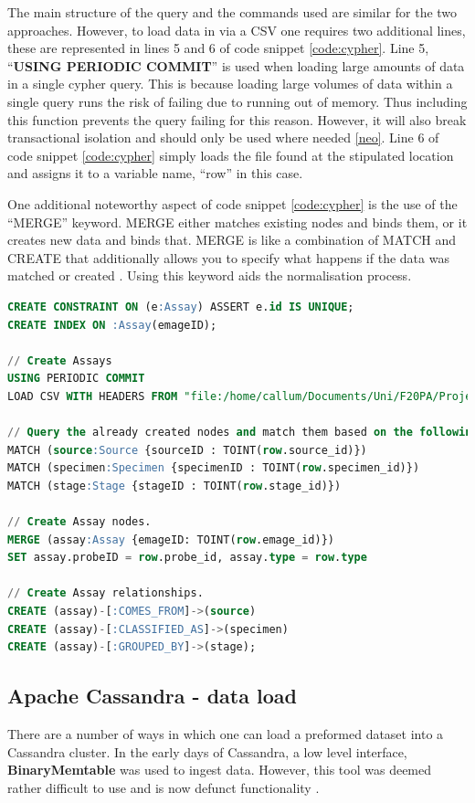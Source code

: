 The main structure of the query and the commands used are similar for the two approaches. However, to load data in via a CSV one requires two additional lines, these are represented in lines 5 and 6 of code snippet \ref{code:cypher}. Line 5, ``\textbf{USING PERIODIC COMMIT}'' is used when loading large amounts of data in a single cypher query. This is because loading large volumes of data within a single query runs the risk of failing due to running out of memory. Thus including this function prevents the query failing for this reason. However, it will also break transactional isolation and should only be used where needed \ref{neo}. Line 6 of code snippet \ref{code:cypher} simply loads the file found at the stipulated location and assigns it to a variable name, ``row'' in this case.

One additional noteworthy aspect of code snippet \ref{code:cypher} is the use of the ``MERGE'' keyword. MERGE either matches existing nodes and binds them, or it creates new data and binds that. MERGE is like a combination of MATCH and CREATE that additionally allows you to specify what happens if the data was matched or created \cite{neo}. Using this keyword aids the normalisation process.
\newpage
\vspace*{\fill}
\begin{lstlisting}[language=SQL, caption=Cypher file created to load assay data into the Neo4j data model., label=code:cypher]
CREATE CONSTRAINT ON (e:Assay) ASSERT e.id IS UNIQUE;
CREATE INDEX ON :Assay(emageID);

// Create Assays
USING PERIODIC COMMIT
LOAD CSV WITH HEADERS FROM "file:/home/callum/Documents/Uni/F20PA/Project/Neo4j/Data/Assays.csv" AS row

// Query the already created nodes and match them based on the following clauses.
MATCH (source:Source {sourceID : TOINT(row.source_id)})
MATCH (specimen:Specimen {specimenID : TOINT(row.specimen_id)})
MATCH (stage:Stage {stageID : TOINT(row.stage_id)})

// Create Assay nodes.
MERGE (assay:Assay {emageID: TOINT(row.emage_id)})
SET assay.probeID = row.probe_id, assay.type = row.type

// Create Assay relationships.
CREATE (assay)-[:COMES_FROM]->(source)
CREATE (assay)-[:CLASSIFIED_AS]->(specimen)
CREATE (assay)-[:GROUPED_BY]->(stage);
\end{lstlisting}
\vspace*{\fill}
\newpage

\subsection{Apache Cassandra - data load}
There are a number of ways in which one can load a preformed dataset into a Cassandra cluster. In the early days of Cassandra, a low level interface, \textbf{BinaryMemtable} was used to ingest data. However, this tool was deemed rather difficult to use and is now defunct functionality \cite{cass}.

